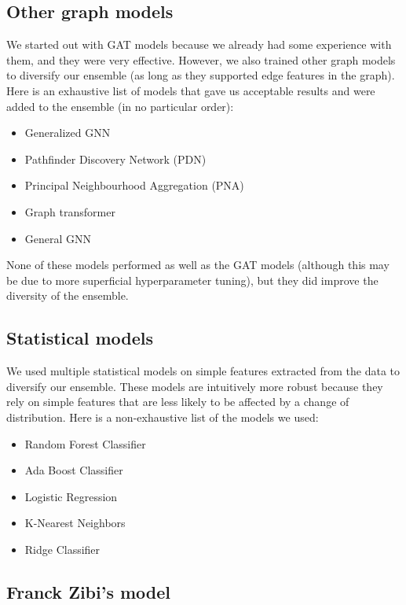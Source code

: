 \documentclass[switch, 11pt]{article}
\begin{document}
\begin{multicols}{2}
    \subsection{Other graph models}

    We started out with GAT models because we already had some experience with them, and they were very effective. However, we also trained other graph models to diversify our ensemble (as long as they supported edge features in the graph). Here is an exhaustive list of models that gave us acceptable results and were added to the ensemble (in no particular order):
    \begin{itemize}
        \item Generalized GNN \cite{li-2020}
        \item Pathfinder Discovery Network (PDN) \cite{rozemberczki-2021}
        \item Principal Neighbourhood Aggregation (PNA) \cite{corso-2020}
        \item Graph transformer \cite{shi-2020}
        \item General GNN \cite{you-2020}
    \end{itemize}

    None of these models performed as well as the GAT models (although this may be due to more superficial hyperparameter tuning), but they did improve the diversity of the ensemble.

    \subsection{Statistical models}

    We used multiple statistical models on simple features extracted from the data to diversify our ensemble. These models are intuitively more robust because they rely on simple features that are less likely to be affected by a change of distribution. Here is a non-exhaustive list of the models we used:
    \begin{itemize}
        \item Random Forest Classifier
        \item Ada Boost Classifier
        \item Logistic Regression
        \item K-Nearest Neighbors
        \item Ridge Classifier
    \end{itemize}

    \subsection{Franck Zibi's model}


\end{multicols}
\end{document}
